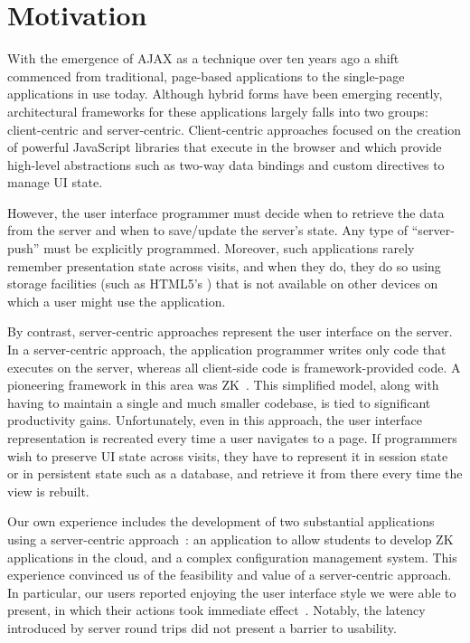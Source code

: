 \section{Motivation}
\label{sec:motivation}

With the emergence of AJAX as a technique over ten years ago a shift commenced from 
traditional, page-based applications to the single-page applications in use today. 
Although hybrid forms have been emerging recently, architectural frameworks for these 
applications largely falls into two groups: client-centric and server-centric.
Client-centric approaches focused on the creation of powerful JavaScript
libraries that execute in the browser and which provide high-level abstractions
such as two-way data bindings and custom directives to manage UI state.

However, the user interface programmer must decide when to retrieve the data
from the server and when to save/update the server's state.  Any type of ``server-push''
must be explicitly programmed.  Moreover, such applications
rarely remember presentation state across visits, and when they do, they do so 
using storage facilities (such as HTML5's ) that is not 
available on other devices on which a user might use the application.

By contrast, server-centric approaches represent the user interface on the server.
In a server-centric approach, the application programmer writes only code
that executes on the server, whereas all client-side code is framework-provided
code.  A pioneering framework in this area was ZK~\cite{ChenCheng:book2007}.
This simplified model, along with having to maintain a single and much smaller codebase,
is tied to significant productivity gains.
Unfortunately, even in this approach, the user interface representation 
is recreated every time a user navigates to a page.  If programmers wish to
preserve UI state across visits, they have to represent it in session state
or in persistent state such as a database, and retrieve it from there every 
time the view is rebuilt.

Our own experience includes the development of two substantial applications
using a server-centric approach~\cite{tilothesis,EdwardsBack:csc2011}:
an application to allow students to develop ZK applications in the cloud, and
a complex configuration management system.  This experience convinced
us of the feasibility and value of a server-centric approach.  In particular,
our users reported enjoying the user interface style we were able to
present, in which their actions took immediate effect~\cite{BaileyBack:igi2013}.
Notably, the latency introduced by server round trips did not present a
barrier to usability.

